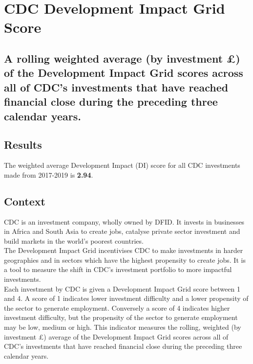 \chapter{CDC Development Impact Grid Score}

\section*{A rolling weighted average (by investment \pounds) of the Development Impact Grid scores across all of CDC's investments that have reached financial close during the preceding three calendar years.}

\bigskip
\bigskip

\thispagestyle{empty}


\section{Results}

The weighted average Development Impact (DI) score for all CDC investments made from 2017-2019 is \textbf{2.94}. %

\section{Context}

CDC is an investment company, wholly owned by DFID. It invests in businesses in
Africa and South Asia to create jobs, catalyse private sector investment and build
markets in the world's poorest countries. \\%
  
The Development Impact Grid incentivises CDC to make investments in harder geographies and in sectors which have the highest propensity to create jobs. %
It is a tool to measure the shift in CDC's investment portfolio to more impactful investments. \\%
  
Each investment by CDC is given a Development Impact Grid score between 1 and 4. %
A score of 1 indicates lower investment difficulty and a lower propensity of the sector to generate employment. %
Conversely a score of 4 indicates higher investment difficulty, but the propensity of the sector to generate employment may be low, medium or high. %
This indicator measures the rolling, weighted (by investment \pounds) average of the Development Impact Grid scores across all of CDC's investments that have reached financial close during the preceding three calendar years. \\%

\newpage
